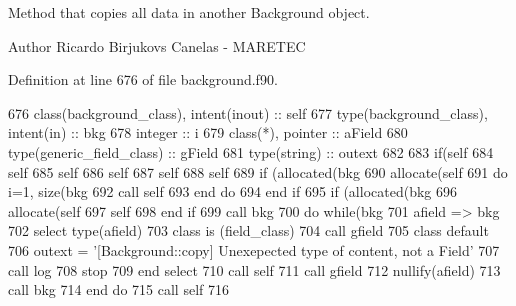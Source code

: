 Method that copies all data in another Background object. 

\begin{DoxyAuthor}{Author}
Ricardo Birjukovs Canelas -\/ M\+A\+R\+E\+T\+EC 
\end{DoxyAuthor}


Definition at line 676 of file background.\+f90.


\begin{DoxyCode}
676     \textcolor{keywordtype}{class}(background\_class), \textcolor{keywordtype}{intent(inout)} :: self
677     \textcolor{keywordtype}{type}(background\_class), \textcolor{keywordtype}{intent(in)} :: bkg
678     \textcolor{keywordtype}{integer} :: i
679     \textcolor{keywordtype}{class}(*), \textcolor{keywordtype}{pointer} :: aField
680     \textcolor{keywordtype}{type}(generic\_field\_class) :: gField
681     \textcolor{keywordtype}{type}(string) :: outext
682 
683     \textcolor{keywordflow}{if}(self%
684     self%
685     self%
686     self%
687     self%
688     self%
689     \textcolor{keywordflow}{if} (\textcolor{keyword}{allocated}(bkg%
690         \textcolor{keyword}{allocate}(self%
691         \textcolor{keywordflow}{do} i=1, \textcolor{keyword}{size}(bkg%
692             \textcolor{keyword}{call }self%
693 \textcolor{keywordflow}{        end do}
694 \textcolor{keywordflow}{    end if}
695     \textcolor{keywordflow}{if} (\textcolor{keyword}{allocated}(bkg%
696         \textcolor{keyword}{allocate}(self%
697         self%
698 \textcolor{keywordflow}{    end if}
699     \textcolor{keyword}{call }bkg%
700     \textcolor{keywordflow}{do} \textcolor{keywordflow}{while}(bkg%
701         afield => bkg%
702         \textcolor{keywordflow}{select type}(afield)
703 \textcolor{keywordflow}{        class is} (field\_class)
704             \textcolor{keyword}{call }gfield%
705 \textcolor{keywordflow}{            class default}
706             outext = \textcolor{stringliteral}{'[Background::copy] Unexepected type of content, not a Field'}
707             \textcolor{keyword}{call }log%
708             stop
709 \textcolor{keywordflow}{        end select}
710         \textcolor{keyword}{call }self%
711         \textcolor{keyword}{call }gfield%
712         \textcolor{keyword}{nullify}(afield)
713         \textcolor{keyword}{call }bkg%
714 \textcolor{keywordflow}{    end do}
715     \textcolor{keyword}{call }self%
716 
\end{DoxyCode}
